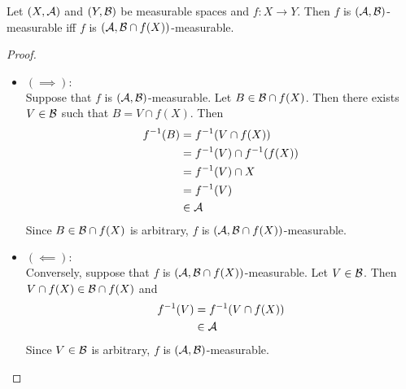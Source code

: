 \documentclass{book}
\begin{document}
	\begin{ex} 
		Let $(X, \mathcal{A})$ and $(Y, \mathcal{B})$ be measurable spaces and $f:X \rightarrow Y$. Then $f$ is $(\mathcal{A}, \mathcal{B})$-measurable iff $f$ is $(\mathcal{A}, \mathcal{B} \cap f(X))$-measurable.
	\end{ex}
	
	\begin{proof}\
		\begin{itemize}
			\item $(\implies):$ \\
			Suppose that $f$ is $(\mathcal{A}, \mathcal{B})$-measurable. Let $B \in \mathcal{B} \cap f(X)$. Then there exists $V \in \mathcal{B}$ such that $B = V \cap f(X)$. Then 
			\begin{align*}
				f^{-1}(B)
				& = f^{-1}(V \cap f(X)) \\
				& = f^{-1}(V) \cap f^{-1}(f(X)) \\
				& = f^{-1}(V) \cap X \\
				& = f^{-1}(V) \\
				& \in \mathcal{A}
			\end{align*}
			Since $B \in \mathcal{B} \cap f(X)$ is arbitrary, $f$ is  $(\mathcal{A}, \mathcal{B} \cap f(X))$-measurable. 
			\item $(\impliedby):$ \\
			Conversely, suppose that $f$ is  $(\mathcal{A}, \mathcal{B} \cap f(X))$-measurable. Let $V \in \mathcal{B}$. Then $V \cap f(X) \in \mathcal{B} \cap f(X)$ and 
			\begin{align*}
				f^{-1}(V)
				& = f^{-1}(V \cap f(X)) \\
				& \in \mathcal{A}  
			\end{align*} 
			Since $V \in \mathcal{B}$ is arbitrary, $f$ is  $(\mathcal{A}, \mathcal{B})$-measurable. 
		\end{itemize}
	\end{proof}
\end{document}
